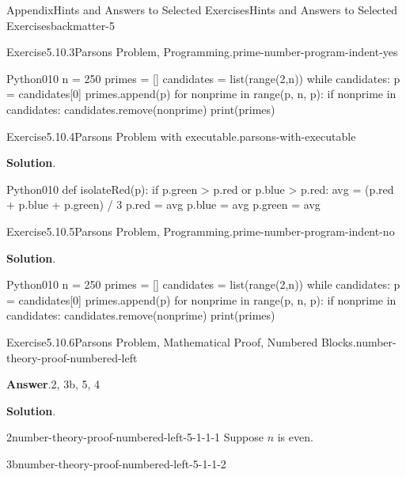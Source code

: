 \documentclass[oneside,10pt,]{book}
\newcommand{\blocktitlefont}{\relax}
\numberwithin{equation}{section}
\begin{document}
\begin{solutions-chapter}{Appendix}{Hints and Answers to Selected Exercises}{}{Hints and Answers to Selected Exercises}{}{}{backmatter-5}
\begin{divisionsolution}{Exercise}{5.10.3}{Parsons Problem, Programming.}{prime-number-program-indent-yes}
\begin{program}{Python}{0}{1}{0}
n = 250
primes = []
candidates = list(range(2,n))
while candidates:
    p = candidates[0]
    primes.append(p)
    for nonprime in range(p, n, p):
        if nonprime in candidates:
            candidates.remove(nonprime)
print(primes)
\end{program}
\end{divisionsolution}%
\begin{divisionsolution}{Exercise}{5.10.4}{Parsons Problem with executable.}{parsons-with-executable}%
\par\smallskip%
\noindent\textbf{\blocktitlefont Solution}.\hypertarget{parsons-with-executable-3-back}{}\quad{}\begin{program}{Python}{0}{1}{0}
def isolateRed(p):
    if p.green > p.red or p.blue > p.red:
        avg = (p.red + p.blue + p.green) / 3
        p.red = avg
        p.blue = avg
        p.green = avg
\end{program}
\end{divisionsolution}%
\begin{divisionsolution}{Exercise}{5.10.5}{Parsons Problem, Programming.}{prime-number-program-indent-no}%
\par\smallskip%
\noindent\textbf{\blocktitlefont Solution}.\hypertarget{prime-number-program-indent-no-5-back}{}\quad{}\begin{program}{Python}{0}{1}{0}
n = 250
primes = []
candidates = list(range(2,n))
while candidates:
    p = candidates[0]
    primes.append(p)
    for nonprime in range(p, n, p):
        if nonprime in candidates:
            candidates.remove(nonprime)
print(primes)
\end{program}
\end{divisionsolution}%
\begin{divisionsolution}{Exercise}{5.10.6}{Parsons Problem, Mathematical Proof, Numbered Blocks.}{number-theory-proof-numbered-left}%
\par\smallskip%
\noindent\textbf{\blocktitlefont Answer}.\hypertarget{number-theory-proof-numbered-left-4-back}{}\quad{}2, 3b, 5, 4%
\par\smallskip%
\noindent\textbf{\blocktitlefont Solution}.\hypertarget{number-theory-proof-numbered-left-5-back}{}\quad{}%
\begin{descriptionlist}
\begin{dlinarrow}{2}{number-theory-proof-numbered-left-5-1-1-1}%
Suppose \(n\) is even.%
\end{dlinarrow}%
\begin{dlinarrow}{3b}{number-theory-proof-numbered-left-5-1-1-2}%

\end{dlinarrow}
\end{descriptionlist}
\end{divisionsolution}
\end{solutions-chapter}
\end{document}
